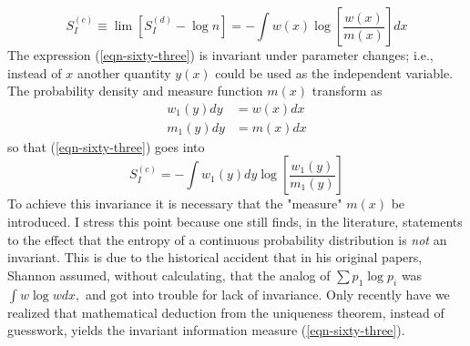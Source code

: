 \documentclass[]{article}
\begin{document}
\begin{equation}
S _{ I }^{( c )} \equiv \lim \left[ S _{ I }^{( d )}-\log n \right]=-\int w ( x ) \log \left[\frac{ w ( x )}{ m ( x )}\right] d x \label{eqn-sixty-three}
\end{equation}
The expression (\ref{eqn-sixty-three}) is invariant under parameter changes; i.e., instead of $x$ another quantity $y(x)$ could be used as the independent variable. The probability density and measure function $m ( x )$ transform as
\begin{align*}
w_{1}(y) d y & =w(x) d x \\
m_{1}(y) d y & =m(x) d x
\end{align*}
so that (\ref{eqn-sixty-three}) goes into
\begin{equation}
S_{I}^{(c)}=-\int w_{1}(y) d y \log \left[\frac{w_{1}(y)}{m_{1}(y)}\right]
\end{equation}
To achieve this invariance it is necessary that the "measure" $m ( x )$ be introduced. I stress this point because one still finds, in the literature, statements to the effect that the entropy of a continuous probability distribution is \emph{not} an invariant. This is due to the historical accident that in his original papers, Shannon\citep{Shannon-mathematical48} assumed, without calculating, that the analog of $\sum p _{1} \log p _{ i }$ was $\int w \log w dx ,$ and got into trouble for lack of invariance. Only recently have we realized that mathematical deduction from the uniqueness theorem, instead of guesswork, yields the invariant information measure (\ref{eqn-sixty-three}).
\end{document}
